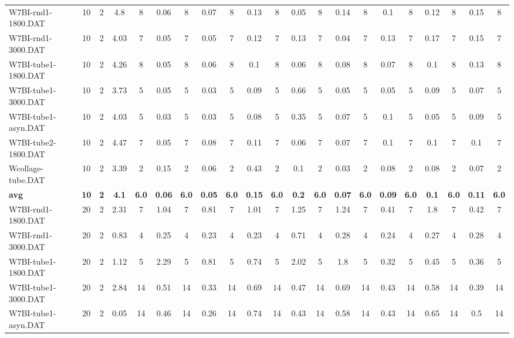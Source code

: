 \begin{sidewaystable}[!ht]
{\begin{tabular}{lcccccccccccccccccccc}
W7BI-rnd1-1800.DAT & 10 & 2 & 4.8 & 8 & 0.06 & 8 & 0.07 & 8 & 0.13 & 8 &  \textcolor{blue2}{0.05} & 8 & 0.14 & 8 & 0.1 & 8 & 0.12 & 8 & 0.15 & 8 \\
W7BI-rnd1-3000.DAT & 10 & 2 & 4.03 & 7 & 0.05 & 7 & 0.05 & 7 & 0.12 & 7 & 0.13 & 7 &  \textcolor{blue2}{0.04} & 7 & 0.13 & 7 & 0.17 & 7 & 0.15 & 7 \\
W7BI-tube1-1800.DAT & 10 & 2 & 4.26 & 8 &  \textcolor{blue2}{0.05} & 8 & 0.06 & 8 & 0.1 & 8 & 0.06 & 8 & 0.08 & 8 & 0.07 & 8 & 0.1 & 8 & 0.13 & 8 \\
W7BI-tube1-3000.DAT & 10 & 2 & 3.73 & 5 & 0.05 & 5 &  \textcolor{blue2}{0.03} & 5 & 0.09 & 5 & 0.66 & 5 & 0.05 & 5 & 0.05 & 5 & 0.09 & 5 & 0.07 & 5 \\
W7BI-tube1-asyn.DAT & 10 & 2 & 4.03 & 5 &  \textcolor{blue2}{0.03} & 5 &  \textcolor{blue2}{0.03} & 5 & 0.08 & 5 & 0.35 & 5 & 0.07 & 5 & 0.1 & 5 & 0.05 & 5 & 0.09 & 5 \\
W7BI-tube2-1800.DAT & 10 & 2 & 4.47 & 7 &  \textcolor{blue2}{0.05} & 7 & 0.08 & 7 & 0.11 & 7 & 0.06 & 7 & 0.07 & 7 & 0.1 & 7 & 0.1 & 7 & 0.1 & 7 \\
Wcollage-tube.DAT & 10 & 2 & 3.39 & 2 & 0.15 & 2 & 0.06 & 2 & 0.43 & 2 & 0.1 & 2 &  \textcolor{blue2}{0.03} & 2 & 0.08 & 2 & 0.08 & 2 & 0.07 & 2 \\
\cline{1-21} \textbf{avg} & \textbf{10} & \textbf{2} & \textbf{4.1} & \textbf{6.0} & \textbf{0.06} & \textbf{6.0} & \textbf{0.05} & \textbf{6.0} & \textbf{0.15} & \textbf{6.0} & \textbf{0.2} & \textbf{6.0} & \textbf{0.07} & \textbf{6.0} & \textbf{0.09} & \textbf{6.0} & \textbf{0.1} & \textbf{6.0} & \textbf{0.11} & \textbf{6.0} \\ \cline{1-21}
W7BI-rnd1-1800.DAT & 20 & 2 & 2.31 & 7 & 1.04 & 7 & 0.81 & 7 & 1.01 & 7 & 1.25 & 7 & 1.24 & 7 &  \textcolor{blue2}{0.41} & 7 & 1.8 & 7 & 0.42 & 7 \\
W7BI-rnd1-3000.DAT & 20 & 2 & 0.83 & 4 & 0.25 & 4 &  \textcolor{blue2}{0.23} & 4 &  \textcolor{blue2}{0.23} & 4 & 0.71 & 4 & 0.28 & 4 & 0.24 & 4 & 0.27 & 4 & 0.28 & 4 \\
W7BI-tube1-1800.DAT & 20 & 2 & 1.12 & 5 & 2.29 & 5 & 0.81 & 5 & 0.74 & 5 & 2.02 & 5 & 1.8 & 5 &  \textcolor{blue2}{0.32} & 5 & 0.45 & 5 & 0.36 & 5 \\
W7BI-tube1-3000.DAT & 20 & 2 & 2.84 & 14 & 0.51 & 14 &  \textcolor{blue2}{0.33} & 14 & 0.69 & 14 & 0.47 & 14 & 0.69 & 14 & 0.43 & 14 & 0.58 & 14 & 0.39 & 14 \\
W7BI-tube1-asyn.DAT & 20 & 2 &  \textcolor{blue2}{0.05} & 14 & 0.46 & 14 & 0.26 & 14 & 0.74 & 14 & 0.43 & 14 & 0.58 & 14 & 0.43 & 14 & 0.65 & 14 & 0.5 & 14 \\

\end{tabular}}
\end{sidewaystable}
